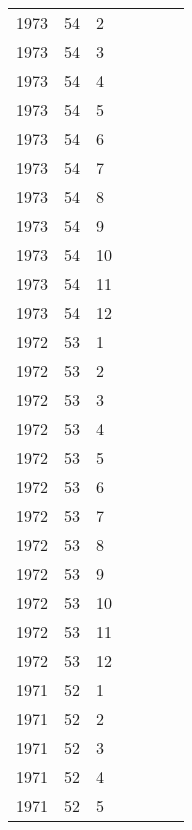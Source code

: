 \begin{longtable}{ |l|l|l|l|p{2.7cm}|l|p{2cm}| }
 1973 & 54 &     2 &         &                &  & \\
 1973 & 54 &     3 &         &                &  & \\
 1973 & 54 &     4 &         &                &  & \\
 1973 & 54 &     5 &         &                &  & \\
 1973 & 54 &     6 &         &                &  & \\
 1973 & 54 &     7 &         &                &  & \\
 1973 & 54 &     8 &         &                &  & \\
 1973 & 54 &     9 &         &                &  & \\
 1973 & 54 &    10 &         &                &  & \\
 1973 & 54 &    11 &         &                &  & \\
 1973 & 54 &    12 &         &                &  & \\
 1972 & 53 &     1 &         &                &  & \\
 1972 & 53 &     2 &         &                &  & \\
 1972 & 53 &     3 &         &                &  & \\
 1972 & 53 &     4 &         &                &  & \\
 1972 & 53 &     5 &         &                &  & \\
 1972 & 53 &     6 &         &                &  & \\
 1972 & 53 &     7 &         &                &  & \\
 1972 & 53 &     8 &         &                &  & \\
 1972 & 53 &     9 &         &                &  & \\
 1972 & 53 &    10 &         &                &  & \\
 1972 & 53 &    11 &         &                &  & \\
 1972 & 53 &    12 &         &                &  & \\
 1971 & 52 &     1 &         &                &  & \\
 1971 & 52 &     2 &         &                &  & \\
 1971 & 52 &     3 &         &                &  & \\
 1971 & 52 &     4 &         &                &  & \\
 1971 & 52 &     5 &         &                &  & \\

\end{longtable}

